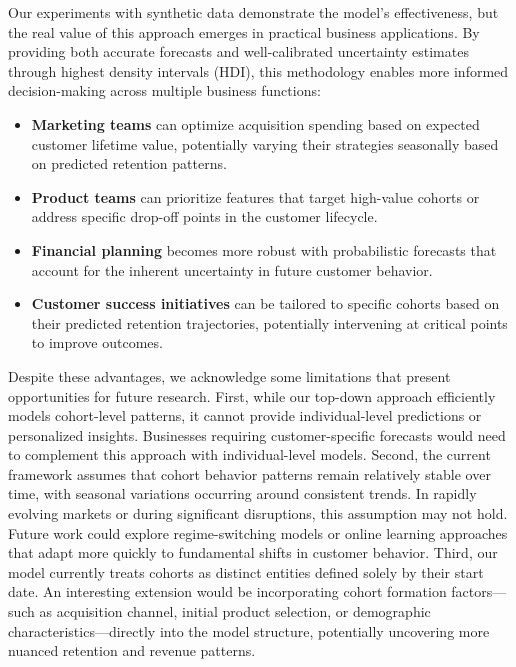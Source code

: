 \documentclass[11pt]{amsart}
\theoremstyle{definition}
\begin{document}
Our experiments with synthetic data demonstrate the model's effectiveness, but the real value of this approach emerges in
practical business applications. By providing both accurate forecasts and well-calibrated uncertainty estimates through
highest density intervals (HDI), this methodology enables more informed decision-making across multiple business functions:

\begin{itemize}
    \item \textbf{Marketing teams} can optimize acquisition spending based on expected customer lifetime value, potentially
          varying their strategies seasonally based on predicted retention patterns.

    \item \textbf{Product teams} can prioritize features that target high-value cohorts or address specific drop-off points
          in the customer lifecycle.

    \item \textbf{Financial planning} becomes more robust with probabilistic forecasts that account for the inherent
          uncertainty in future customer behavior.

    \item \textbf{Customer success initiatives} can be tailored to specific cohorts based on their predicted retention
          trajectories, potentially intervening at critical points to improve outcomes.
\end{itemize}

Despite these advantages, we acknowledge some limitations that present opportunities for future research. First, while our
top-down approach efficiently models cohort-level patterns, it cannot provide individual-level predictions or personalized
insights. Businesses requiring customer-specific forecasts would need to complement this approach with individual-level
models. Second, the current framework assumes that cohort behavior patterns remain relatively stable over time, with seasonal
variations occurring around consistent trends. In rapidly evolving markets or during significant disruptions, this assumption
may not hold. Future work could explore regime-switching models or online learning approaches that adapt more quickly to
fundamental shifts in customer behavior. Third, our model currently treats cohorts as distinct entities defined solely
by their start date. An interesting extension would be incorporating cohort formation factors—such as acquisition channel,
initial product selection, or demographic characteristics—directly into the model structure, potentially uncovering more
nuanced retention and revenue patterns.
\end{document}
